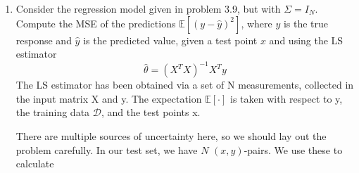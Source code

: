 \documentclass{article}
\newcommand{\chapternumber}{3}
\newenvironment{QandA}{\begin{enumerate}[label=\chapternumber.\arabic*]\bfseries\boldmath}
	{\end{enumerate}}
\newenvironment{answered}{\par\bigskip\normalfont\unboldmath}{}
\begin{document}
\begin{QandA}
\begin{answered}
	\end{answered}
	
	\item Consider the regression model given in problem 3.9, but with $\Sigma=I_N$. Compute the MSE of the predictions $\mathbb{E}[(y-\hat{y})^2]$, where $y$ is the true response and $\hat{y}$ is the predicted value, given a test point $x$ and using the LS estimator
	\[\hat{\theta}=\left(X^TX\right)^{-1}X^Ty\]
	The LS estimator has been obtained via a set of N measurements, collected in the input matrix X and y. The expectation $\mathbb{E}[\cdot]$ is taken with respect to y, the training data $\mathcal{D}$, and the test points x.
	
	\begin{answered}
		There are multiple sources of uncertainty here, so we should lay out the problem carefully. In our test set, we have $N$ $(x,y)$-pairs. We use these to calculate 
	\end{answered}
		
	\end{QandA}
	
\end{document}

